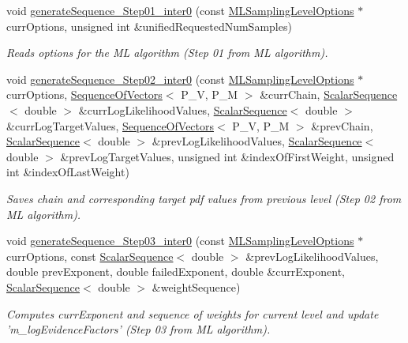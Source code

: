 \begin{DoxyCompactItemize}
void \hyperlink{class_q_u_e_s_o_1_1_m_l_sampling_aea8da13aed5b04e64b8490ca5f107889}{generate\-Sequence\-\_\-\-Step01\-\_\-inter0} (const \hyperlink{class_q_u_e_s_o_1_1_m_l_sampling_level_options}{M\-L\-Sampling\-Level\-Options} $\ast$curr\-Options, unsigned int \&unified\-Requested\-Num\-Samples)
\begin{DoxyCompactList}\small\item\em Reads options for the M\-L algorithm (Step 01 from M\-L algorithm). \end{DoxyCompactList}\item 
void \hyperlink{class_q_u_e_s_o_1_1_m_l_sampling_a06c37730b943a1838d58475d322639b9}{generate\-Sequence\-\_\-\-Step02\-\_\-inter0} (const \hyperlink{class_q_u_e_s_o_1_1_m_l_sampling_level_options}{M\-L\-Sampling\-Level\-Options} $\ast$curr\-Options, \hyperlink{class_q_u_e_s_o_1_1_sequence_of_vectors}{Sequence\-Of\-Vectors}$<$ P\-\_\-\-V, P\-\_\-\-M $>$ \&curr\-Chain, \hyperlink{class_q_u_e_s_o_1_1_scalar_sequence}{Scalar\-Sequence}$<$ double $>$ \&curr\-Log\-Likelihood\-Values, \hyperlink{class_q_u_e_s_o_1_1_scalar_sequence}{Scalar\-Sequence}$<$ double $>$ \&curr\-Log\-Target\-Values, \hyperlink{class_q_u_e_s_o_1_1_sequence_of_vectors}{Sequence\-Of\-Vectors}$<$ P\-\_\-\-V, P\-\_\-\-M $>$ \&prev\-Chain, \hyperlink{class_q_u_e_s_o_1_1_scalar_sequence}{Scalar\-Sequence}$<$ double $>$ \&prev\-Log\-Likelihood\-Values, \hyperlink{class_q_u_e_s_o_1_1_scalar_sequence}{Scalar\-Sequence}$<$ double $>$ \&prev\-Log\-Target\-Values, unsigned int \&index\-Of\-First\-Weight, unsigned int \&index\-Of\-Last\-Weight)
\begin{DoxyCompactList}\small\item\em Saves chain and corresponding target pdf values from previous level (Step 02 from M\-L algorithm). \end{DoxyCompactList}\item 
void \hyperlink{class_q_u_e_s_o_1_1_m_l_sampling_ae53e6bc0ec5d1f3d3ac9df268086cd75}{generate\-Sequence\-\_\-\-Step03\-\_\-inter0} (const \hyperlink{class_q_u_e_s_o_1_1_m_l_sampling_level_options}{M\-L\-Sampling\-Level\-Options} $\ast$curr\-Options, const \hyperlink{class_q_u_e_s_o_1_1_scalar_sequence}{Scalar\-Sequence}$<$ double $>$ \&prev\-Log\-Likelihood\-Values, double prev\-Exponent, double failed\-Exponent, double \&curr\-Exponent, \hyperlink{class_q_u_e_s_o_1_1_scalar_sequence}{Scalar\-Sequence}$<$ double $>$ \&weight\-Sequence)
\begin{DoxyCompactList}\small\item\em Computes {\ttfamily curr\-Exponent} and sequence of weights for current level and update 'm\-\_\-log\-Evidence\-Factors' (Step 03 from M\-L algorithm). \end{DoxyCompactList}\item 

\end{DoxyCompactItemize}
